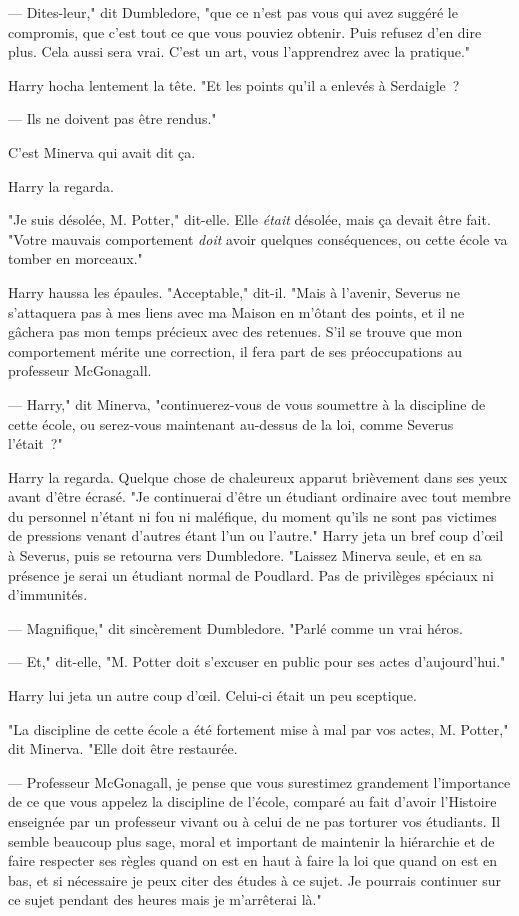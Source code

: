 --- Dites-leur," dit Dumbledore, "que ce n'est pas vous qui avez suggéré le compromis, que c'est tout ce que vous pouviez obtenir. Puis refusez d'en dire plus. Cela aussi sera vrai. C'est un art, vous l'apprendrez avec la pratique."

Harry hocha lentement la tête. "Et les points qu'il a enlevés à Serdaigle~?

--- Ils ne doivent pas être rendus."

C'est Minerva qui avait dit ça.

Harry la regarda.

"Je suis désolée, M. Potter," dit-elle. Elle \emph{était} désolée, mais ça devait être fait. "Votre mauvais comportement \emph{doit} avoir quelques conséquences, ou cette école va tomber en morceaux."

Harry haussa les épaules. "Acceptable," dit-il. "Mais à l'avenir, Severus ne s'attaquera pas à mes liens avec ma Maison en m'ôtant des points, et il ne gâchera pas mon temps précieux avec des retenues. S'il se trouve que mon comportement mérite une correction, il fera part de ses préoccupations au professeur McGonagall.

--- Harry," dit Minerva, "continuerez-vous de vous soumettre à la discipline de cette école, ou serez-vous maintenant au-dessus de la loi, comme Severus l'était~?"

Harry la regarda. Quelque chose de chaleureux apparut brièvement dans ses yeux avant d'être écrasé. "Je continuerai d'être un étudiant ordinaire avec tout membre du personnel n'étant ni fou ni maléfique, du moment qu'ils ne sont pas victimes de pressions venant d'autres étant l'un ou l'autre." Harry jeta un bref coup d'œil à Severus, puis se retourna vers Dumbledore. "Laissez Minerva seule, et en sa présence je serai un étudiant normal de Poudlard. Pas de privilèges spéciaux ni d'immunités.

--- Magnifique," dit sincèrement Dumbledore. "Parlé comme un vrai héros.

--- Et," dit-elle, "M. Potter doit s'excuser en public pour ses actes d'aujourd'hui."

Harry lui jeta un autre coup d'œil. Celui-ci était un peu sceptique.

"La discipline de cette école a été fortement mise à mal par vos actes, M. Potter," dit Minerva. "Elle doit être restaurée.

--- Professeur McGonagall, je pense que vous surestimez grandement l'importance de ce que vous appelez la discipline de l'école, comparé au fait d'avoir l'Histoire enseignée par un professeur vivant ou à celui de ne pas torturer vos étudiants. Il semble beaucoup plus sage, moral et important de maintenir la hiérarchie et de faire respecter ses règles quand on est en haut à faire la loi que quand on est en bas, et si nécessaire je peux citer des études à ce sujet. Je pourrais continuer sur ce sujet pendant des heures mais je m'arrêterai là."

